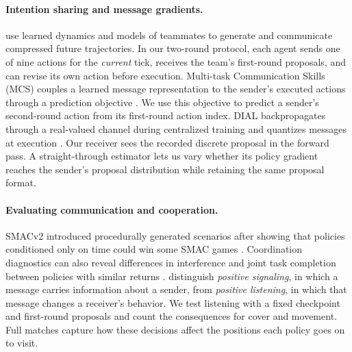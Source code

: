 \paragraph{Intention sharing and message gradients.}
\citet{kim2021intention} use learned dynamics and models of teammates to generate and communicate compressed future trajectories. In our two-round protocol, each agent sends one of nine actions for the \emph{current} tick, receives the team's first-round proposals, and can revise its own action before execution. Multi-task Communication Skills (MCS) couples a learned message representation to the sender's executed actions through a prediction objective \citep{zhu2026mcs}. We use this objective to predict a sender's second-round action from its first-round action index. DIAL backpropagates through a real-valued channel during centralized training and quantizes messages at execution \citep{foerster2016dial}. Our receiver sees the recorded discrete proposal in the forward pass. A straight-through estimator lets us vary whether its policy gradient reaches the sender's proposal distribution while retaining the same proposal format.

\paragraph{Evaluating communication and cooperation.}
SMACv2 introduced procedurally generated scenarios after showing that policies conditioned only on time could win some SMAC games \citep{ellis2023smacv2}. Coordination diagnostics can also reveal differences in interference and joint task completion between policies with similar returns \citep{cardei2026coordination}. \citet{lowe2019pitfalls} distinguish \emph{positive signaling}, in which a message carries information about a sender, from \emph{positive listening}, in which that message changes a receiver's behavior. We test listening with a fixed checkpoint and first-round proposals and count the consequences for cover and movement. Full matches capture how these decisions affect the positions each policy goes on to visit.
